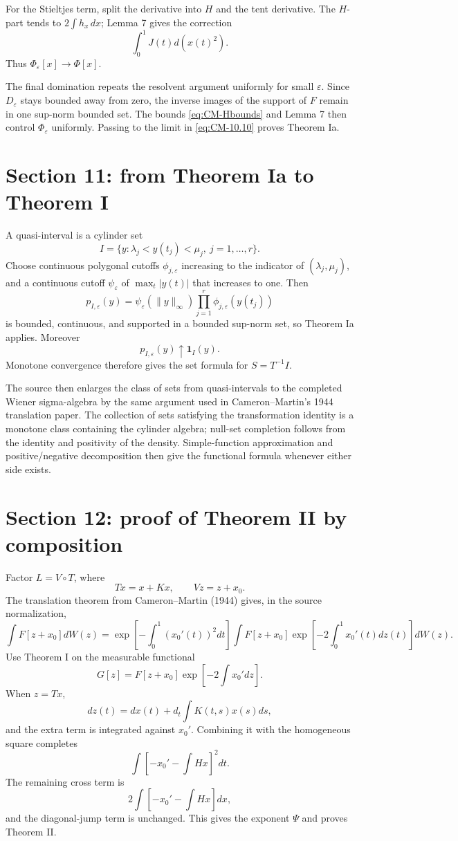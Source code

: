 For the Stieltjes term, split the derivative into \(H\) and the tent derivative.  The \(H\)-part tends to \(2\int h_x\,dx\); Lemma 7 gives the correction
\[
 \int_0^1J(t)d(x(t)^2).
\]
Thus \(\Phi_\varepsilon[x]\to\Phi[x]\).

The final domination repeats the resolvent argument uniformly for small \(\varepsilon\).  Since \(D_\varepsilon\) stays bounded away from zero, the inverse images of the support of \(F\) remain in one sup-norm bounded set.  The bounds \eqref{eq:CM-Hbounds} and Lemma 7 then control \(\Phi_\varepsilon\) uniformly.  Passing to the limit in \eqref{eq:CM-10.10} proves Theorem Ia.

\section{Section 11: from Theorem Ia to Theorem I}

A quasi-interval is a cylinder set
\[
 I=\{y:\lambda_j<y(t_j)<\mu_j,\ j=1,\ldots,r\}.
\]
Choose continuous polygonal cutoffs \(\phi_{j,\varepsilon}\) increasing to the indicator of \((\lambda_j,\mu_j)\), and a continuous cutoff \(\psi_\varepsilon\) of \(\max_t|y(t)|\) that increases to one.  Then
\[
 p_{I,\varepsilon}(y)
 =\psi_\varepsilon(\|y\|_\infty)
  \prod_{j=1}^r\phi_{j,\varepsilon}(y(t_j))
\]
is bounded, continuous, and supported in a bounded sup-norm set, so Theorem Ia applies.  Moreover
\[
 p_{I,\varepsilon}(y)\uparrow\mathbf1_I(y).
\]
Monotone convergence therefore gives the set formula for \(S=T^{-1}I\).

The source then enlarges the class of sets from quasi-intervals to the completed Wiener sigma-algebra by the same argument used in Cameron--Martin's 1944 translation paper.  The collection of sets satisfying the transformation identity is a monotone class containing the cylinder algebra; null-set completion follows from the identity and positivity of the density.  Simple-function approximation and positive/negative decomposition then give the functional formula whenever either side exists.

\section{Section 12: proof of Theorem II by composition}

Factor \(L=V\circ T\), where
\[
 Tx=x+Kx,
 \qquad
 Vz=z+x_0.
\]
The translation theorem from Cameron--Martin (1944) \cite{CameronMartin1944Translations} gives, in the source normalization,
\[
 \int F[z+x_0]dW(z)
 =\exp\left[-\int_0^1(x_0'(t))^2dt\right]
 \int F[z+x_0]\exp\left[-2\int_0^1x_0'(t)dz(t)\right]dW(z).
\]
Use Theorem I on the measurable functional
\[
 G[z]=F[z+x_0]\exp\left[-2\int x_0' dz\right].
\]
When \(z=Tx\),
\[
 dz(t)=dx(t)+d_t\int K(t,s)x(s)ds,
\]
and the extra term is integrated against \(x_0'\).  Combining it with the homogeneous square completes
\[
 \int\left[-x_0'-\int Hx\right]^2dt.
\]
The remaining cross term is
\[
 2\int\left[-x_0'-\int Hx\right]dx,
\]
and the diagonal-jump term is unchanged.  This gives the exponent \(\Psi\) and proves Theorem II.

